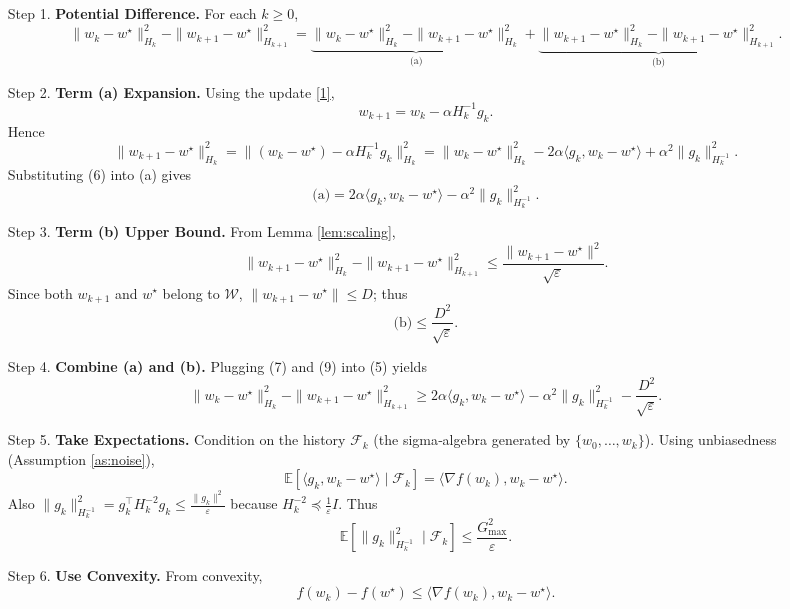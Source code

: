 \documentclass{article}
\newcommand{\E}{\mathbb{E}}
\begin{document}
\begin{enumerate}
\item[Step 1.] \textbf{Potential Difference.}  
For each $k\ge0$,
\[
\|w_k-w^\star\|_{H_k}^2
   -\|w_{k+1}-w^\star\|_{H_{k+1}}^2
   = \underbrace{\|w_k-w^\star\|_{H_k}^2
   -\|w_{k+1}-w^\star\|_{H_k}^2}_{\text{(a)}}
   +\underbrace{\|w_{k+1}-w^\star\|_{H_k}^2
   -\|w_{k+1}-w^\star\|_{H_{k+1}}^2}_{\text{(b)}} .
\tag{5}
\]
\item[Step 2.] \textbf{Term (a) Expansion.} Using the update \eqref{1},
\[
w_{k+1}=w_k-\alpha H_k^{-1} g_k .
\]
Hence
\[
\|w_{k+1}-w^\star\|_{H_k}^2
   =\|(w_k-w^\star)-\alpha H_k^{-1}g_k\|_{H_k}^2
   =\|w_k-w^\star\|_{H_k}^2
     -2\alpha\langle g_k,w_k-w^\star\rangle
     +\alpha^2\|g_k\|_{H_k^{-1}}^2 .
\tag{6}
\]
Substituting (6) into (a) gives
\[
\text{(a)} = 2\alpha\langle g_k,w_k-w^\star\rangle
            -\alpha^2\|g_k\|_{H_k^{-1}}^2 .
\tag{7}
\]

\item[Step 3.] \textbf{Term (b) Upper Bound.}  
From Lemma \ref{lem:scaling},
\[
\|w_{k+1}-w^\star\|_{H_k}^2
   -\|w_{k+1}-w^\star\|_{H_{k+1}}^2
   \le \frac{\|w_{k+1}-w^\star\|^2}{\sqrt{\varepsilon}} .
\tag{8}
\]
Since both $w_{k+1}$ and $w^\star$ belong to $\mathcal{W}$,
$\|w_{k+1}-w^\star\|\le D$; thus
\[
\text{(b)}\le \frac{D^2}{\sqrt{\varepsilon}} .
\tag{9}
\]

\item[Step 4.] \textbf{Combine (a) and (b).}  
Plugging (7) and (9) into (5) yields
\[
\|w_k-w^\star\|_{H_k}^2
   -\|w_{k+1}-w^\star\|_{H_{k+1}}^2
   \ge 2\alpha\langle g_k,w_k-w^\star\rangle
        -\alpha^2\|g_k\|_{H_k^{-1}}^2
        -\frac{D^2}{\sqrt{\varepsilon}} .
\tag{10}
\]

\item[Step 5.] \textbf{Take Expectations.}  
Condition on the history $\mathcal{F}_k$ (the sigma‑algebra generated by
$\{w_0,\dots,w_k\}$). Using unbiasedness (Assumption \ref{as:noise}),
\[
\E\!\left[\langle g_k,w_k-w^\star\rangle\mid\mathcal{F}_k\right]
   =\langle\nabla f(w_k),w_k-w^\star\rangle .
\tag{11}
\]
Also $\|g_k\|_{H_k^{-1}}^2 = g_k^{\!\top} H_k^{-2} g_k \le
\frac{\|g_k\|^2}{\varepsilon}$ because $H_k^{-2}\preceq \frac{1}{\varepsilon}I$.
Thus
\[
\E\!\left[\|g_k\|_{H_k^{-1}}^2\mid\mathcal{F}_k\right]
   \le \frac{G_{\max}^2}{\varepsilon}.
\tag{12}
\]

\item[Step 6.] \textbf{Use Convexity.}  
From convexity,
\[
f(w_k)-f(w^\star) \le \langle\nabla f(w_k),w_k-w^\star\rangle .
\tag{13}
\]


\end{enumerate}
\end{document}

